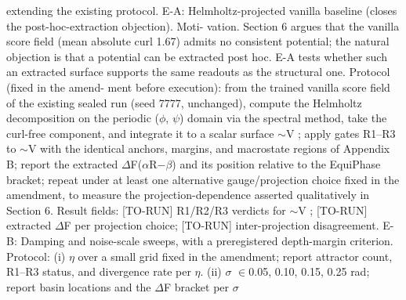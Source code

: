 \documentclass{article}
\begin{document}
extending the existing protocol.
E-A: Helmholtz-projected vanilla baseline (closes the post-hoc-extraction objection).
Moti-
vation. Section 6 argues that the vanilla score field (mean absolute curl 1.67) admits no consistent
potential; the natural objection is that a potential can be extracted post hoc. E-A tests whether such
an extracted surface supports the same readouts as the structural one. Protocol (fixed in the amend-
ment before execution): from the trained vanilla score field of the existing sealed run (seed 7777,
unchanged), compute the Helmholtz decomposition on the periodic ($\phi$, $\psi$) domain via the spectral
method, take the curl-free component, and integrate it to a scalar surface $\sim$V ; apply gates R1--R3 to
$\sim$V with the identical anchors, margins, and macrostate regions of Appendix B; report the extracted
$\Delta$F($\alpha$R$-$$\beta$) and its position relative to the EquiPhase bracket; repeat under at least one alternative
gauge/projection choice fixed in the amendment, to measure the projection-dependence asserted
qualitatively in Section 6. Result fields: [TO-RUN] R1/R2/R3 verdicts for $\sim$V ; [TO-RUN] extracted
$\Delta$F per projection choice; [TO-RUN] inter-projection disagreement.
E-B: Damping and noise-scale sweeps, with a preregistered depth-margin criterion.
Protocol:
(i) $\eta$ over a small grid fixed in the amendment; report attractor count, R1--R3 status, and divergence
rate per $\eta$. (ii) $\sigma$ $\in${0.05, 0.10, 0.15, 0.25} rad; report basin locations and the $\Delta$F bracket per $\sigma$
\clearpage

\end{document}
